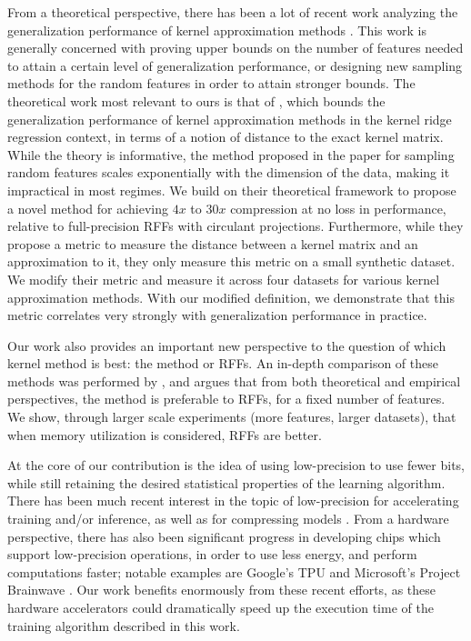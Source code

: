 From a theoretical perspective, there has been a lot of recent work analyzing the generalization performance of kernel approximation methods \citep{bach13,alaoui15,rudi15,optrff15,musco17,rudi17,bach17,avron17}. This work is generally concerned with proving upper bounds on the number of features needed to attain a certain level of generalization performance, or designing new sampling methods for the random features in order to attain stronger bounds. The theoretical work most relevant to ours is that of \citet{avron17}, which bounds the generalization performance of kernel approximation methods in the kernel ridge regression context, in terms of a notion of distance to the exact kernel matrix.  While the theory is informative, the method proposed in the paper for sampling random features scales exponentially with the dimension of the data, making it impractical in most regimes. We build on their theoretical framework to propose a novel method for achieving $4x$ to $30x$ compression at no loss in performance, relative to full-precision RFFs with circulant projections. Furthermore, while they propose a metric to measure the distance between a kernel matrix and an approximation to it, they only measure this metric on a small synthetic dataset. We modify their metric and measure it across four datasets for various kernel approximation methods. With our modified definition, we demonstrate that this metric correlates very strongly with generalization performance in practice.

Our work also provides an important new perspective to the question of which kernel method is best: the \Nystrom method or RFFs. An in-depth comparison of these methods was performed by \citet{nysvsrff12}, and argues that from both theoretical and empirical perspectives, the \Nystrom method is preferable to RFFs, for a fixed number of features. We show, through larger scale experiments (more features, larger datasets), that when memory utilization is considered, RFFs are better.

At the core of our contribution is the idea of using low-precision to use fewer bits, while still retaining the desired statistical properties of the learning algorithm.  There has been much recent interest in the topic of low-precision for accelerating training and/or inference, as well as for compressing models \citep{gupta15,hogwild15,hubara16,halp18,desa17,han15}.  From a hardware perspective, there has also been significant progress in developing chips which support low-precision operations, in order to use less energy, and perform computations faster; notable examples are Google's TPU \citep{tpu17} and Microsoft's Project Brainwave \citep{brainwave17}. Our work benefits enormously from these recent efforts, as these hardware accelerators could dramatically speed up the execution time of the training algorithm described in this work.